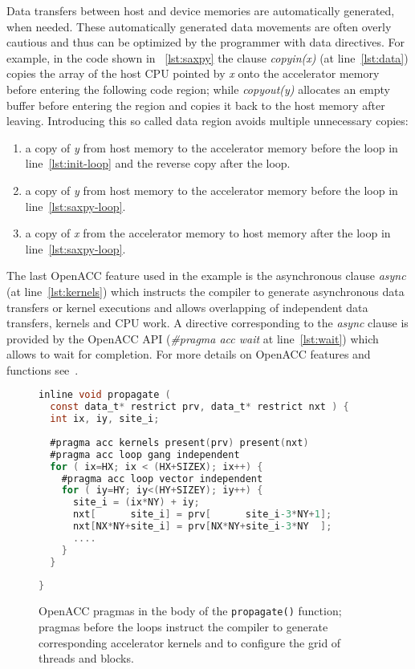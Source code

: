 \documentclass[times]{cpeauth}
\begin{document}
Data transfers between host and device memories are automatically generated,
when needed. These automatically generated data movements are often overly
cautious and thus can be optimized by the programmer with data directives. 
%
For example, in the code shown in \figurename~\ref{lst:saxpy} the clause 
\textit{copyin(x)} (at line~\ref{lst:data}) copies the array of the host CPU 
pointed by \textit{x} onto the accelerator memory before entering the
following code region; while \textit{copyout(y)} allocates an empty buffer
before entering the region and copies it back to the host memory after leaving.
Introducing this so called data region avoids multiple unnecessary copies:
\begin{enumerate}
\item a copy of \textit{y} from host memory to the accelerator memory before 
the loop in line~\ref{lst:init-loop} and the reverse copy after the loop.
\item a copy of \textit{y} from host memory to the accelerator memory before 
the loop in line~\ref{lst:saxpy-loop}.
\item a copy of \textit{x} from the accelerator memory to host memory after 
the loop in line~\ref{lst:saxpy-loop}.
\end{enumerate}

The last OpenACC feature used in the example is the asynchronous clause \textit{async}
(at line~\ref{lst:kernels}) which instructs the compiler to generate asynchronous data
transfers or kernel executions and allows overlapping of independent data transfers,
kernels and CPU work. A directive corresponding to the \textit{async} clause is
provided by the OpenACC API (\textit{\#pragma acc wait} at line~\ref{lst:wait})
which allows to wait for completion. 
%
For more details on OpenACC features and functions see~\cite{openacc}.

%
\begin{figure}[t]
\centering
\begin{lstlisting}[language=C,basicstyle=\footnotesize]
inline void propagate ( 
  const data_t* restrict prv, data_t* restrict nxt ) {
  int ix, iy, site_i;
  
  #pragma acc kernels present(prv) present(nxt)
  #pragma acc loop gang independent
  for ( ix=HX; ix < (HX+SIZEX); ix++) {
    #pragma acc loop vector independent
    for ( iy=HY; iy<(HY+SIZEY); iy++) {
      site_i = (ix*NY) + iy;
      nxt[      site_i] = prv[      site_i-3*NY+1];
      nxt[NX*NY+site_i] = prv[NX*NY+site_i-3*NY  ];
      ....
    } 
  } 
  
}
\end{lstlisting}
\caption{\label{fig:propagate} OpenACC pragmas in the body of the 
{\tt propagate()} function; pragmas before the loops instruct the 
compiler to generate corresponding accelerator 
kernels and to configure the grid of threads and blocks.}
\end{figure}
%
\end{document}
